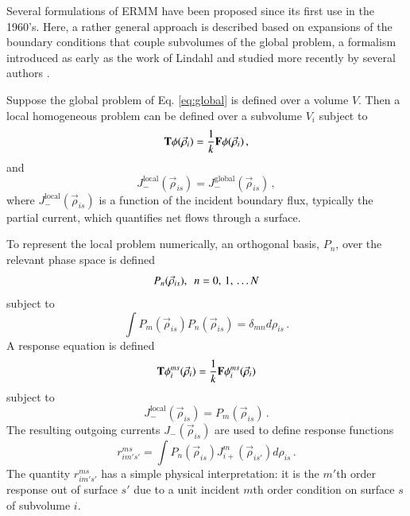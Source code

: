 Several formulations of ERMM have been proposed since its first use in 
the 1960's. Here, a rather general approach is described based 
on expansions of the boundary conditions that couple
subvolumes of the global problem, a formalism introduced 
as early as the work of Lindahl \cite{lindahl1976mdr} and
studied more recently by several authors
\cite{mosher2006ifr, roberts2011ser, roberts2012ksi}.

Suppose the global problem 
of Eq. \ref{eq:global} is defined over a 
volume $V$.  Then a local homogeneous problem can be defined over a 
subvolume $V_i$ subject to 
\begin{equation}
  \mathbf{T} \phi(\vec{\rho}_i) = 
    \frac{1}{k} \mathbf{F} \phi(\vec{\rho}_i) \, ,
  \label{eq:local}
\end{equation}
and
\begin{equation}
  J^{\mathrm{local}}_{-} (\vec{\rho}_{is}) = 
    J^{\mathrm{global}}_{-}(\vec{\rho}_{is}) \, ,
  \label{eq:localbc}
\end{equation}   
where $J^{\mathrm{local}}_{-} (\vec{\rho}_{is}) $ is a 
function of the incident boundary flux, typically the 
partial current, which quantifies net flows through a 
surface.

To represent the local problem numerically, an orthogonal basis, $P_n$,
over the relevant phase space is defined
\begin{equation}
  P_n(\vec{\rho}_{is}), \,\,\, n = 0, \, 1, \, \ldots N  \\
\end{equation}
subject to
\begin{equation}
   \int P_m(\vec{\rho}_{is}) P_n(\vec{\rho}_{is}) 
     = \delta_{mn} d\rho_{is} \, .
\end{equation}
A response equation is defined 
\begin{equation}
 \mathbf{T} \phi_{i}^{ms} (\vec{\rho}_i) = 
   \frac{1}{k} \mathbf{F} \phi_{i}^{ms} (\vec{\rho}_i) 
\end{equation}
subject to
\begin{equation}
 J^{\mathrm{local}}_{-} (\vec{\rho}_{is}) = P_m(\vec{\rho}_{is}) \, .
\end{equation}
The resulting outgoing currents $J_{-} (\vec{\rho}_{is}) $ are used to define
response functions
\begin{equation}
       r^{ms}_{im's'} = \int  P_n(\vec{\rho}_{is})  
        J_{i+}^{m} (\vec{\rho}_{is'}) d\rho_{is} \, .
\label{eq:responsefunction}
\end{equation}
The quantity $r^{ms}_{im's'}$ has a simple physical
interpretation: it is the $m'$th order response 
out of surface $s'$ due to a unit incident $m$th order condition on 
surface $s$ of subvolume $i$. 

